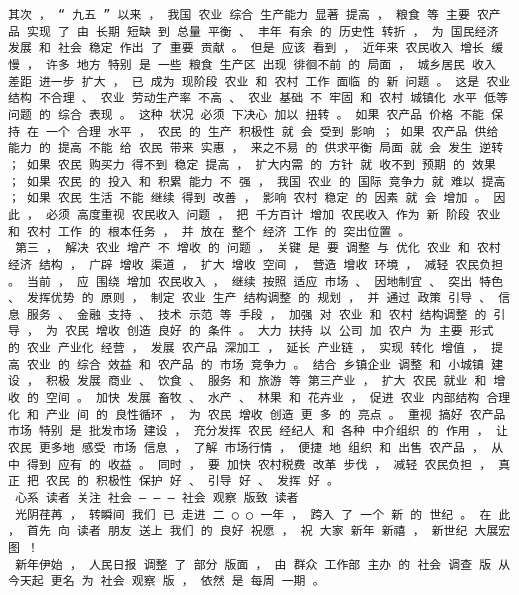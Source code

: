 \documentclass{article}
\begin{document}
\begin{Verbatim}[commandchars=\\\{\}]
 其次 ， “ 九五 ” 以来 ， 我国 农业 综合 生产能力 显著 提高 ， 粮食 等 主要 农产品 实现 了 由 长期 短缺 到 总量 平衡 、 丰年 有余 的 历史性 转折 ， 为 国民经济 发展 和 社会 稳定 作出 了 重要 贡献 。 但是 应该 看到 ， 近年来 农民收入 增长 缓慢 ， 许多 地方 特别 是 一些 粮食 生产区 出现 徘徊不前 的 局面 ， 城乡居民 收入 差距 进一步 扩大 ， 已 成为 现阶段 农业 和 农村 工作 面临 的 新 问题 。 这是 农业 结构 不合理 、 农业 劳动生产率 不高 、 农业 基础 不 牢固 和 农村 城镇化 水平 低等 问题 的 综合 表现 。 这种 状况 必须 下决心 加以 扭转 。 如果 农产品 价格 不能 保持 在 一个 合理 水平 ， 农民 的 生产 积极性 就 会 受到 影响 ； 如果 农产品 供给 能力 的 提高 不能 给 农民 带来 实惠 ， 来之不易 的 供求平衡 局面 就 会 发生 逆转 ； 如果 农民 购买力 得不到 稳定 提高 ， 扩大内需 的 方针 就 收不到 预期 的 效果 ； 如果 农民 的 投入 和 积累 能力 不 强 ， 我国 农业 的 国际 竞争力 就 难以 提高 ； 如果 农民 生活 不能 继续 得到 改善 ， 影响 农村 稳定 的 因素 就 会 增加 。 因此 ， 必须 高度重视 农民收入 问题 ， 把 千方百计 增加 农民收入 作为 新 阶段 农业 和 农村 工作 的 根本任务 ， 并 放在 整个 经济 工作 的 突出位置 。 
 第三 ， 解决 农业 增产 不 增收 的 问题 ， 关键 是 要 调整 与 优化 农业 和 农村 经济 结构 ， 广辟 增收 渠道 ， 扩大 增收 空间 ， 营造 增收 环境 ， 减轻 农民负担 。 当前 ， 应 围绕 增加 农民收入 ， 继续 按照 适应 市场 、 因地制宜 、 突出 特色 、 发挥优势 的 原则 ， 制定 农业 生产 结构调整 的 规划 ， 并 通过 政策 引导 、 信息 服务 、 金融 支持 、 技术 示范 等 手段 ， 加强 对 农业 和 农村 结构调整 的 引导 ， 为 农民 增收 创造 良好 的 条件 。 大力 扶持 以 公司 加 农户 为 主要 形式 的 农业 产业化 经营 ， 发展 农产品 深加工 ， 延长 产业链 ， 实现 转化 增值 ， 提高 农业 的 综合 效益 和 农产品 的 市场 竞争力 。 结合 乡镇企业 调整 和 小城镇 建设 ， 积极 发展 商业 、 饮食 、 服务 和 旅游 等 第三产业 ， 扩大 农民 就业 和 增收 的 空间 。 加快 发展 畜牧 、 水产 、 林果 和 花卉业 ， 促进 农业 内部结构 合理化 和 产业 间 的 良性循环 ， 为 农民 增收 创造 更 多 的 亮点 。 重视 搞好 农产品 市场 特别 是 批发市场 建设 ， 充分发挥 农民 经纪人 和 各种 中介组织 的 作用 ， 让 农民 更多地 感受 市场 信息 ， 了解 市场行情 ， 便捷 地 组织 和 出售 农产品 ， 从中 得到 应有 的 收益 。 同时 ， 要 加快 农村税费 改革 步伐 ， 减轻 农民负担 ， 真正 把 农民 的 积极性 保护 好 、 引导 好 、 发挥 好 。 
 心系 读者 关注 社会 — — — 社会 观察 版致 读者 
 光阴荏苒 ， 转瞬间 我们 已 走进 二 ○ ○ 一年 ， 跨入 了 一个 新 的 世纪 。 在 此 ， 首先 向 读者 朋友 送上 我们 的 良好 祝愿 ， 祝 大家 新年 新禧 ， 新世纪 大展宏图 ！ 
 新年伊始 ， 人民日报 调整 了 部分 版面 ， 由 群众 工作部 主办 的 社会 调查 版 从今天起 更名 为 社会 观察 版 ， 依然 是 每周 一期 。 

\end{Verbatim}
\end{document}
